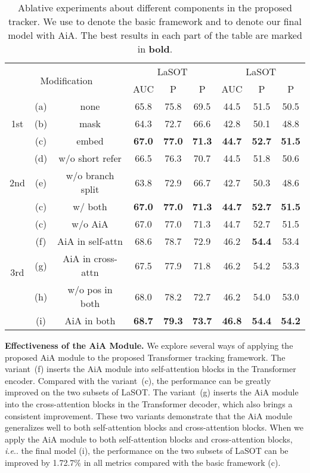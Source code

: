 \documentclass[runningheads]{llncs}
\makeatletter
\DeclareRobustCommand\onedot{\futurelet\@let@token\@onedot}
\def\@onedot{\ifx\@let@token.\else.\null\fi\xspace}
\def\ie{\emph{i.e}\onedot} \def\Ie{\emph{I.e}\onedot}
\makeatother
\begin{document}
\begin{table}[t]
\centering
\begin{tabular}{ccc|ccc|ccc}
\hline
\multicolumn{3}{c|}{\multirow{2}{*}{Modification}}
& \multicolumn{3}{c|}{LaSOT \cite{fan2019lasot}}
& \multicolumn{3}{c}{LaSOT \cite{fan2021lasot}} \\
& & & AUC & P & \multicolumn{1}{c|}{P}
& AUC & P & P \\
\hline
\multicolumn{1}{c|}{\multirow{3}{*}{1st}} & (a) & none & 
65.8 & 75.8 & 69.5 & 44.5 & 51.5 & 50.5 \\
\multicolumn{1}{c|}{} & (b) & mask & 
64.3 & 72.7 & 66.6 & 42.8 & 50.1 & 48.8 \\
\multicolumn{1}{c|}{} & (c) & embed & 
\textbf{67.0} & \textbf{77.0} & \textbf{71.3} & \textbf{44.7} & \textbf{52.7} & \textbf{51.5} \\
\hline
\multicolumn{1}{c|}{\multirow{3}{*}{2nd}} & (d) & w/o short refer & 
66.5 & 76.3 & 70.7 & 44.5 & 51.8 & 50.6 \\
\multicolumn{1}{c|}{} & (e) & w/o branch split & 
63.8 & 72.9 & 66.7 & 42.7 & 50.3 & 48.6 \\
\multicolumn{1}{c|}{} & (c) & w/ both & 
\textbf{67.0} & \textbf{77.0} & \textbf{71.3} & \textbf{44.7} & \textbf{52.7} & \textbf{51.5} \\
\hline
\multicolumn{1}{c|}{\multirow{6}{*}{3rd}} & (c) & w/o AiA & 
67.0 & 77.0 & 71.3 & 44.7 & 52.7 & 51.5 \\
\multicolumn{1}{c|}{} & (f) & AiA in self-attn & 
68.6 & 78.7 & 72.9 & 46.2 & \textbf{54.4} & 53.4 \\
\multicolumn{1}{c|}{} & (g) & AiA in cross-attn & 
67.5 & 77.9 & 71.8 & 46.2 & 54.2 & 53.3 \\
\multicolumn{1}{c|}{} & (h) & w/o pos in both & 
68.0 & 78.2 & 72.7 & 46.2 & 54.0 & 53.0 \\
\multicolumn{1}{c|}{} & (i) & AiA in both & 
\textbf{68.7} & \textbf{79.3} & \textbf{73.7} & \textbf{46.8} & \textbf{54.4} & \textbf{54.2} \\
\hline
\end{tabular}
\caption{Ablative experiments about different components in the proposed tracker. We use  to denote the basic framework and  to denote our final model with AiA. The best results in each part of the table are marked in \textbf{bold}.}
\label{table-ablation}
\end{table}

\noindent\textbf{Effectiveness of the AiA Module.} We explore several ways of applying the proposed AiA module to the proposed Transformer tracking framework. The variant~(f) inserts the AiA module into self-attention blocks in the Transformer encoder. Compared with the variant~(c), the performance can be greatly improved on the two subsets of LaSOT. The variant~(g) inserts the AiA module into the cross-attention blocks in the Transformer decoder, which also brings a consistent improvement. These two variants demonstrate that the AiA module generalizes well to both self-attention blocks and cross-attention blocks. When we apply the AiA module to both self-attention blocks and cross-attention blocks, \ie the final model (i), the performance on the two subsets of LaSOT can be improved by 1.72.7\% in all metrics compared with the basic framework (c).
\end{document}
